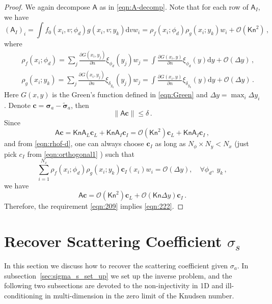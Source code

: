 \documentclass[english,reqno]{amsart}
\theoremstyle{plain}
\theoremstyle{definition} %
\renewcommand{\vec}[1]{\mathbf{#1}}
\newcommand{\Amat}{\mathsf{A}}
\newcommand{\rd}{\mathrm{d}}
\newcommand{\Kn}{\mathsf{Kn}}
\begin{document}
\begin{proof}
We again decompose $\Amat$ as in \eqref{eqn:A-decomp}. Note that for each row of $\Amat_I$, we have
\begin{equation*}
(\Amat_I)_i = \int f_0(x_i, v; \phi_d) g(x_i, v; y_k) \rd{v}  w_i = \rho_f(x_i; \phi_d) \rho_g(x_i; y_k) w_i + \mathcal{O}(\Kn^2)\,,
\end{equation*}
where
\begin{eqnarray*}
&&\rho_f(x_i; \phi_d) = \sum_j \frac{\partial G(x_i, y_j)}{\partial n} \xi_{\phi_d}(y_j) w_j= \int \frac{\partial G(x_i, y)}{\partial n } \xi_{\phi_d}(y) \rd{y} + \mathcal{O}(\Delta y ) \,, \label{eqn:rhof-d}
\\ &&\rho_g(x_i; y_k) = \sum_j \frac{\partial G(x_i, y_j)}{\partial n} \xi_{\delta_{y_k}}(y_j) w_j= \int \frac{\partial G(x_i, y)}{\partial n } \xi_{\delta_{y_k}}(y) \rd{y} + \mathcal{O}(\Delta y ) \,. \label{eqn:rhog-d}
\end{eqnarray*} 
Here $G(x,y)$ is the Green's function defined in \eqref{eqn:Green} and $\Delta y = \max_i \Delta y _i$. Denote $\vec{c} = \vec{\sigma}_a - \vec{\tilde{\sigma}}_a$, then 
\begin{equation} \label{eqn:209}
\|\Amat\vec{c}\| \leq \delta\,. 
\end{equation}
Since
\begin{equation*}
 \Amat \vec{c} =  \Kn  \Amat_L \vec{c}_L   + \Kn   \Amat_I \vec{c}_I = \mathcal{O}(\Kn^2)  \vec{c}_L  + \mathcal{\Kn}   \Amat_I \vec{c}_I \,,
\end{equation*}
and from \eqref{eqn:rhof-d}, one can always choose $\vec{c}_I$ as long as $N_\phi \times N_y < N_x$ (just pick $c_I$ from \eqref{eqn:orthogonal1} ) such that 
\[
\sum_{i=1}^{N_x} \rho_f(x_i; \phi_d) \rho_g(x_i; y_k) \vec{c}_I(x_i) w_i = \mathcal{O}(\Delta y), \quad \forall \phi_d, ~ y_k\,,
\]
we have 
\begin{equation*}
 \Amat \vec{c} = \mathcal{O}(\Kn^2) \vec{c}_L + \mathcal{O}(\Kn \Delta y) \vec{c}_I\,.
\end{equation*}
Therefore, the requirement \eqref{eqn:209} implies \eqref{eqn:222}.
\end{proof}








\section{Recover Scattering Coefficient $\sigma_s$}
In this section we discuss how to recover the scattering coefficient given $\sigma_a$. In subsection~\ref{sec:sigma_s_set_up} we set up the inverse problem, and the following two subsections are devoted to the non-injectivity in 1D and ill-conditioning in multi-dimension in the zero limit of the Knudsen number.
\end{document}
